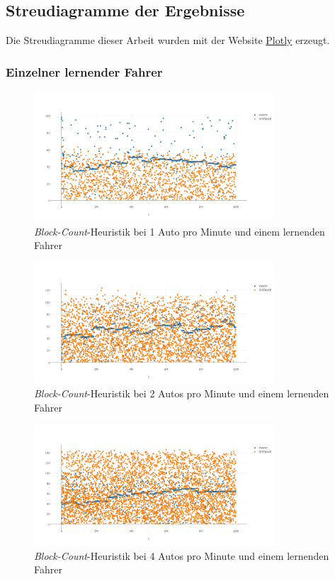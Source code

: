 \subsection*{Streudiagramme der Ergebnisse}
Die Streudiagramme dieser Arbeit wurden mit der Website \href{http:plot.ly/plot}{Plotly} erzeugt.
\subsubsection*{Einzelner lernender Fahrer}
\begin{figure}[H]
	\includegraphics[width=0.8\textwidth]{analyse/SingleMutant/blockcount1.png}
	\caption{\emph{Block-Count}-Heuristik bei 1 Auto pro Minute und einem lernenden Fahrer}\label{fig:ap_sm_bc_1}
\end{figure}
\begin{figure}[H]
	\includegraphics[width=0.8\textwidth]{analyse/SingleMutant/blockcount2.png}
	\caption{\emph{Block-Count}-Heuristik bei 2 Autos pro Minute und einem lernenden Fahrer}\label{fig:ap_sm_bc_2}
\end{figure}
\begin{figure}[H]
	\includegraphics[width=0.8\textwidth]{analyse/SingleMutant/blockcount4.png}
	\caption{\emph{Block-Count}-Heuristik bei 4 Autos pro Minute und einem lernenden Fahrer}\label{fig:ap_sm_bc_4}
\end{figure}
